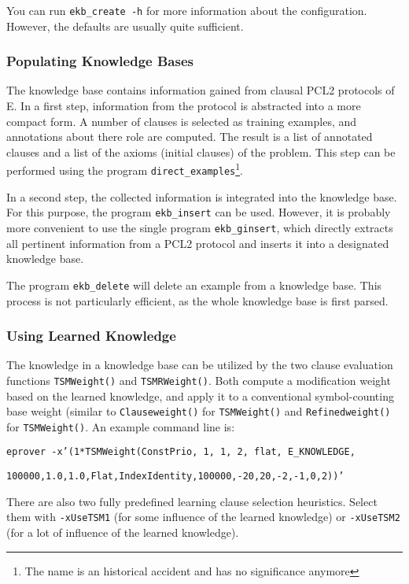 \documentclass{article}
\begin{document}
You can run \texttt{ekb\_create -h} for more information about the
configuration. However, the defaults are usually quite sufficient.


\subsubsection{Populating Knowledge Bases}

The knowledge base contains information gained from clausal PCL2
protocols of E. In a first step, information from the protocol is
abstracted into a more compact form. A number of clauses is selected
as training examples, and annotations about there role are computed.
The result is a list of annotated clauses and a list of the axioms
(initial clauses) of the problem. This step can be performed using the
program \texttt{direct\_examples}\footnote{The name is an historical
  accident and has no significance anymore}. 

In a second step, the collected information is integrated into the
knowledge base. For this purpose, the program \texttt{ekb\_insert}
can be used. However, it is probably more convenient to use the single
program \texttt{ekb\_ginsert}, which directly extracts all pertinent
information from a PCL2 protocol and inserts it into a designated
knowledge base.

The program \texttt{ekb\_delete} will delete an example from a
knowledge base. This process is not particularly efficient, as the
whole knowledge base is first parsed.


\subsubsection{Using Learned Knowledge}

The knowledge in a knowledge base can be utilized by the two clause
evaluation functions \texttt{TSMWeight()} and \texttt{TSMRWeight()}.
Both compute a modification weight based on the learned knowledge, and
apply it to a conventional symbol-counting base weight (similar to
\texttt{Clauseweight()} for \texttt{TSMWeight()} and 
\texttt{Refinedweight()} for \texttt{TSMWeight()}. An example command
line is:

\texttt{eprover -x'(1*TSMWeight(ConstPrio, 1, 1, 2, flat,
  E\_KNOWLEDGE,}

\texttt{100000,1.0,1.0,Flat,IndexIdentity,100000,-20,20,-2,-1,0,2))'}

There are also two fully predefined learning clause selection
heuristics. Select them with \texttt{-xUseTSM1} (for some influence of
the learned knowledge) or \texttt{-xUseTSM2} (for a lot of influence
of the learned knowledge).
\end{document}
